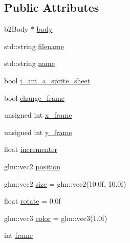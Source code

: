\subsection*{Public Attributes}
\begin{DoxyCompactItemize}
\item 
b2\+Body $\ast$ \hyperlink{classEntity_a2b6ad094dc400a22a508aaccd956f9fd}{body}
\item 
std\+::string \hyperlink{classEntity_a6a4de89770f168dbe6134fec0c5f2ad1}{filename}
\item 
std\+::string \hyperlink{classEntity_a931b21fbdebb1a5963b4bcab5df128f5}{name}
\item 
bool \hyperlink{classEntity_a173e8f73ab7942235c1c3a4a1f4c40b0}{i\+\_\+am\+\_\+a\+\_\+sprite\+\_\+sheet}
\item 
bool \hyperlink{classEntity_a319afd83a878db68e6de473418e9a1f3}{change\+\_\+frame}
\item 
unsigned int \hyperlink{classEntity_ae38d1819b321f27f5771bf6d21af3c6f}{x\+\_\+frame}
\item 
unsigned int \hyperlink{classEntity_a778391410b1ff1f89fd6f06c8b636072}{y\+\_\+frame}
\item 
float \hyperlink{classEntity_a97cf0dd2b95f85c3f611c30f7a9fbf68}{incrementer}
\item 
glm\+::vec2 \hyperlink{classEntity_a01a4c7bdc113c1cbec8326a3f8d7d452}{position}
\item 
glm\+::vec2 \hyperlink{classEntity_a4cac664de0560de978d85456f5426baa}{size} = glm\+::vec2(10.\+0f, 10.\+0f)
\item 
float \hyperlink{classEntity_ad0baaae3c8c1c760bceb2e2c8676842b}{rotate} = 0.\+0f
\item 
glm\+::vec3 \hyperlink{classEntity_a688dc0de5b453c60a542a4dbdf06322e}{color} = glm\+::vec3(1.\+0f)
\item 
int \hyperlink{classEntity_a806d820393849740ea10917ef5a7f427}{frame}
\end{DoxyCompactItemize}

